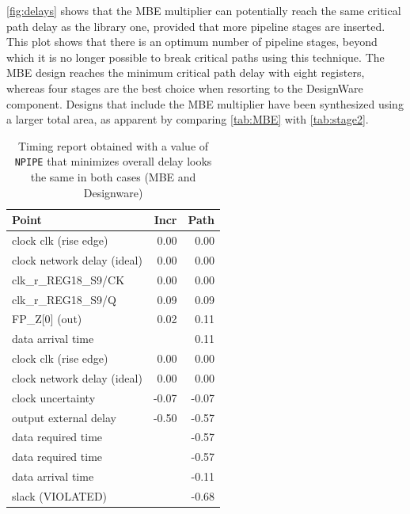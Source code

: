 \autoref{fig:delays} shows that the MBE multiplier can potentially reach the same critical path delay as the library one, provided that more pipeline stages are inserted. This plot shows that there is an optimum number of pipeline stages, beyond which it is no longer possible to break critical paths using this technique. The MBE design reaches the minimum critical path delay with eight registers, whereas four stages are the best choice when resorting to the DesignWare component. Designs that include the MBE multiplier have been synthesized using a larger total area, as apparent by comparing \autoref{tab:MBE} with \autoref{tab:stage2}.

\begin{table}
	\centering
	\begin{tabular}{|lrr|}\hline
		Point & Incr & Path \\\hline
		clock clk (rise edge)        &           0.00 &      0.00\\
		clock network delay (ideal)  &            0.00    &   0.00\\
		clk\_r\_REG18\_S9/CK           &    0.00 &      0.00\\
		clk\_r\_REG18\_S9/Q             &  0.09   &    0.09\\
		FP\_Z[0] (out)                  &          0.02  &     0.11\\
		data arrival time                &               &    0.11\\\hline
		clock clk (rise edge)             &       0.00    &   0.00\\
		clock network delay (ideal)        &      0.00     &  0.00\\
		clock uncertainty                   &    -0.07  &    -0.07\\
		output external delay                &   -0.50   &   -0.57\\\hline
		data required time                    &           &  -0.57\\
		data required time                     &         &   -0.57\\
		data arrival time                       &         &  -0.11\\\hline
		slack (VIOLATED)                         &         & -0.68\\\hline
	\end{tabular}
	\caption{Timing report obtained with a value of \texttt{NPIPE} that minimizes overall delay looks the same in both cases (MBE and Designware)}
	\label{tab:report}
\end{table}

